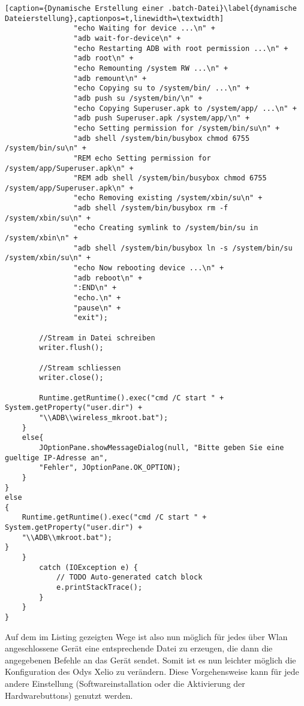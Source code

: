 \begin{flushleft}
\begin{lstlisting}[caption={Dynamische Erstellung einer .batch-Datei}\label{dynamische Dateierstellung},captionpos=t,linewidth=\textwidth]
				"echo Waiting for device ...\n" +
				"adb wait-for-device\n" +
				"echo Restarting ADB with root permission ...\n" +
				"adb root\n" +
				"echo Remounting /system RW ...\n" +
				"adb remount\n" +
				"echo Copying su to /system/bin/ ...\n" +
				"adb push su /system/bin/\n" +
				"echo Copying Superuser.apk to /system/app/ ...\n" +
				"adb push Superuser.apk /system/app/\n" +
				"echo Setting permission for /system/bin/su\n" +
				"adb shell /system/bin/busybox chmod 6755 /system/bin/su\n" +
				"REM echo Setting permission for /system/app/Superuser.apk\n" +
				"REM adb shell /system/bin/busybox chmod 6755 /system/app/Superuser.apk\n" +
				"echo Removing existing /system/xbin/su\n" +
				"adb shell /system/bin/busybox rm -f /system/xbin/su\n" +
				"echo Creating symlink to /system/bin/su in /system/xbin\n" +
				"adb shell /system/bin/busybox ln -s /system/bin/su /system/xbin/su\n" +
				"echo Now rebooting device ...\n" +
				"adb reboot\n" +
				":END\n" +
				"echo.\n" +
				"pause\n" +
				"exit");
				
		//Stream in Datei schreiben
		writer.flush();
								
		//Stream schliessen
		writer.close();
								
		Runtime.getRuntime().exec("cmd /C start " + System.getProperty("user.dir") + 
		"\\ADB\\wireless_mkroot.bat");
	}
	else{
		JOptionPane.showMessageDialog(null, "Bitte geben Sie eine gueltige IP-Adresse an", 
		"Fehler", JOptionPane.OK_OPTION);
	}
}
else
{
	Runtime.getRuntime().exec("cmd /C start " + System.getProperty("user.dir") + 
	"\\ADB\\mkroot.bat"); 
}	
	}
		catch (IOException e) {
			// TODO Auto-generated catch block
			e.printStackTrace();
		}
	}
}
\end{lstlisting}

Auf dem im Listing gezeigten Wege ist also nun möglich für jedes über Wlan angeschlossene Gerät eine entsprechende Datei zu erzeugen, die dann die angegebenen Befehle an das Gerät sendet. Somit ist es nun leichter möglich die Konfiguration des Odys Xelio zu verändern. Diese Vorgehensweise kann für jede andere Einstellung (Softwareinstallation oder die Aktivierung der Hardwarebuttons) genutzt werden. 


\end{flushleft}
